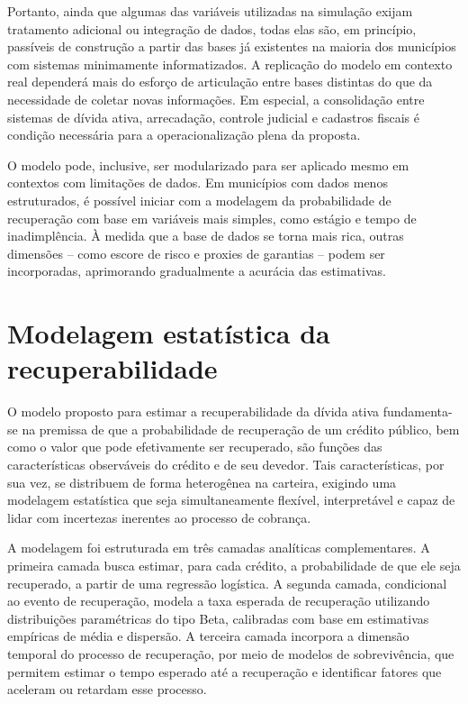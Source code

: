 \documentclass[a4paper,12pt]{article}
\begin{document}
Portanto, ainda que algumas das variáveis utilizadas na simulação exijam tratamento adicional ou integração de dados, todas elas são, em princípio, passíveis de construção a partir das bases já existentes na maioria dos municípios com sistemas minimamente informatizados. A replicação do modelo em contexto real dependerá mais do esforço de articulação entre bases distintas do que da necessidade de coletar novas informações. Em especial, a consolidação entre sistemas de dívida ativa, arrecadação, controle judicial e cadastros fiscais é condição necessária para a operacionalização plena da proposta.

O modelo pode, inclusive, ser modularizado para ser aplicado mesmo em contextos com limitações de dados. Em municípios com dados menos estruturados, é possível iniciar com a modelagem da probabilidade de recuperação com base em variáveis mais simples, como estágio e tempo de inadimplência. À medida que a base de dados se torna mais rica, outras dimensões – como escore de risco e proxies de garantias – podem ser incorporadas, aprimorando gradualmente a acurácia das estimativas.


\section{Modelagem estatística da recuperabilidade} 
O modelo proposto para estimar a recuperabilidade da dívida ativa fundamenta-se na premissa de que a probabilidade de recuperação de um crédito público, bem como o valor que pode efetivamente ser recuperado, são funções das características observáveis do crédito e de seu devedor. Tais características, por sua vez, se distribuem de forma heterogênea na carteira, exigindo uma modelagem estatística que seja simultaneamente flexível, interpretável e capaz de lidar com incertezas inerentes ao processo de cobrança.

A modelagem foi estruturada em três camadas analíticas complementares. A primeira camada busca estimar, para cada crédito, a probabilidade de que ele seja recuperado, a partir de uma regressão logística. A segunda camada, condicional ao evento de recuperação, modela a taxa esperada de recuperação utilizando distribuições paramétricas do tipo Beta, calibradas com base em estimativas empíricas de média e dispersão. A terceira camada incorpora a dimensão temporal do processo de recuperação, por meio de modelos de sobrevivência, que permitem estimar o tempo esperado até a recuperação e identificar fatores que aceleram ou retardam esse processo.
\end{document}

